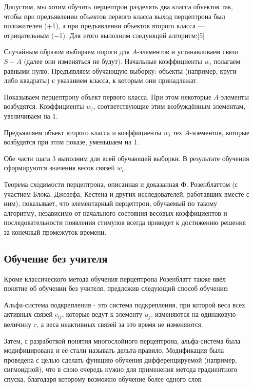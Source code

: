 Допустим, мы хотим обучить перцептрон разделять два класса объектов так, чтобы при предъявлении объектов первого класса выход перцептрона был положителен (+1), а при предъявлении объектов второго класса — отрицательным (−1). Для этого выполним следующий алгоритм:[5]

Случайным образом выбираем пороги для $A$-элементов и устанавливаем связи $S-A$ (далее они изменяться не будут).
Начальные коэффициенты $w_i$ полагаем равными нулю.
Предъявляем обучающую выборку: объекты (например, круги либо квадраты) с указанием класса, к которым они принадлежат.

Показываем перцептрону объект первого класса. При этом некоторые $A$-элементы возбудятся. Коэффициенты $w_i$, соответствующие этим возбуждённым элементам, увеличиваем на 1.

Предъявляем объект второго класса и коэффициенты $w_i$ тех $A$-элементов, которые возбудятся при этом показе, уменьшаем на 1.
    
Обе части шага 3 выполним для всей обучающей выборки. В результате обучения сформируются значения весов связей $w_i$.

Теорема сходимости перцептрона, описанная и доказанная Ф. Розенблаттом (с участием Блока, Джозефа, Кестена и других исследователей, работавших вместе с ним), показывает, что элементарный перцептрон, обучаемый по такому алгоритму, независимо от начального состояния весовых коэффициентов и последовательности появления стимулов всегда приведет к достижению решения за конечный промежуток времени.

\subsection{Обучение без учителя}

Кроме классического метода обучения перцептрона Розенблатт также ввёл понятие об обучении без учителя, предложив следующий способ обучения:

Альфа-система подкрепления - это система подкрепления, при которой веса всех активных связей $c_{ij}$, которые ведут к элементу $u_j$, изменяются на одинаковую величину $r$, а веса неактивных связей за это время не изменяются.

Затем, с разработкой понятия многослойного перцептрона, альфа-система была модифицирована и её стали называть дельта-правило. Модификация была проведена с целью сделать функцию обучения дифференцируемой (например, сигмоидной), что в свою очередь нужно для применения метода градиентного спуска, благодаря которому возможно обучение более одного слоя.

